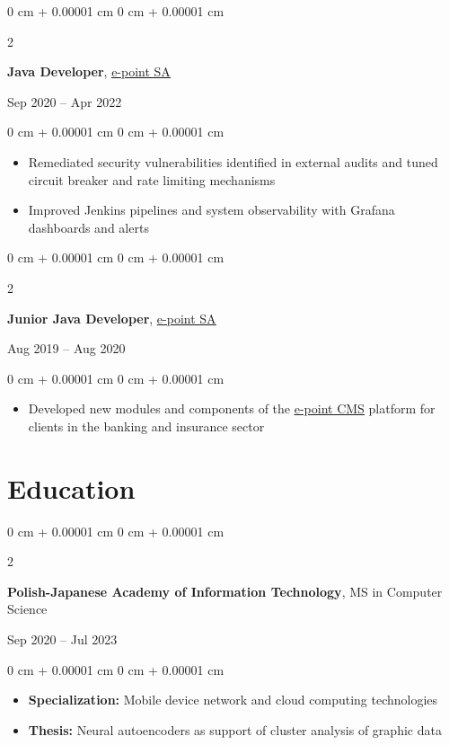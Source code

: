 \documentclass[10pt, letterpaper]{article}
\newenvironment{highlights}{
  \begin{itemize}[
        topsep=0.05 cm,
        parsep=0.05 cm,
        partopsep=0pt,
        itemsep=0pt,
        leftmargin=0 cm + 10pt
      ]
    }{
  \end{itemize}
} %
\newenvironment{onecolentry}{
  \begin{adjustwidth}{
      0 cm + 0.00001 cm
    }{
      0 cm + 0.00001 cm
    }
  }{
  \end{adjustwidth}
} %
\newenvironment{twocolentry}[2][]{
  \onecolentry
  \def\secondColumn{#2}
  \setcolumnwidth{\fill, 4.5 cm}
  \begin{paracol}{2}
  }{
    \switchcolumn \raggedleft \secondColumn
  \end{paracol}
  \endonecolentry
} %
\let\hrefOriginal\href
\renewcommand{\href}[2]{\hrefOriginal{#1}{\uline{#2}}}
\begin{document}
\vspace{0.1 cm}

\begin{twocolentry}
  { Sep 2020 – Apr 2022 }
  \textbf{Java Developer}, \href{https://www.e-point.com/}{e-point SA}
\end{twocolentry}
\vspace{0.1 cm}
\begin{onecolentry}
  \begin{highlights}
  \item Remediated security vulnerabilities identified in external
    audits and tuned circuit breaker and rate limiting mechanisms
  \item Improved Jenkins pipelines and system observability with Grafana
    dashboards and alerts
  \end{highlights}
\end{onecolentry}

\vspace{0.1 cm}

\begin{twocolentry}
  { Aug 2019 – Aug 2020 }
  \textbf{Junior Java Developer}, \href{https://www.e-point.com/}{e-point SA}
\end{twocolentry}
\vspace{0.1 cm}
\begin{onecolentry}
  \begin{highlights}
  \item Developed new modules and components of the
    \href{https://www.e-point.com/produkty/e-point-cms}{e-point CMS}
    platform for clients in the banking and insurance sector
  \end{highlights}
\end{onecolentry}


\section{Education}
\begin{twocolentry}
  { Sep 2020 – Jul 2023 }
  \textbf{Polish-Japanese Academy of Information Technology},
  MS in Computer Science
\end{twocolentry}
\vspace{0.1 cm}
\begin{onecolentry}
  \begin{highlights}
  \item \textbf{Specialization:}
    Mobile device network and cloud computing technologies
  \item \textbf{Thesis:}
    Neural autoencoders as support of cluster analysis of graphic data
  \end{highlights}
\end{onecolentry}
\end{document}
